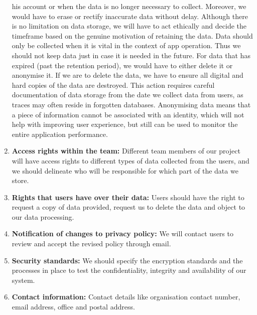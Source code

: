 \begin{enumerate}
    his account or when the data is no longer necessary to collect. Moreover, we would have to erase or rectify inaccurate data without delay. Although 
    there is no limitation on data storage, we will have to act ethically and
    decide the timeframe based on the genuine motivation of retaining the data. Data should only be collected when it is vital in the context
    of app operation. Thus we should not keep data just in case it is needed in the future. For data that has expired (past the retention period), we 
    would have to either delete it or anonymise it. If we are to delete the data, we have to ensure all digital and hard copies of the data are destroyed. 
    This action requires careful documentation of data storage from the date we collect data from users, as traces may often reside in forgotten databases.
    Anonymising data means that a piece of information cannot be associated with an identity, which will not help with improving user experience, but still 
    can be used to monitor the entire application performance.
    \item \textbf{Access rights within the team:} Different team members of our project will have access rights to different types of data collected from
    the users, and we should delineate who will be responsible for which part of the data we store.
    \item \textbf{Rights that users have over their data:} Users should have the right to request a copy of data provided, request us to delete the data and object to our data processing.
    \item \textbf{Notification of changes to privacy policy:} We will contact users to review and accept the revised policy through email.
    \item \textbf{Security standards:} We should specify the encryption standards and the processes in place to test the confidentiality, integrity and availability of 
    our system.
    \item \textbf{Contact information:} Contact details like organisation contact number, email address, office and postal address.
\end{enumerate}


